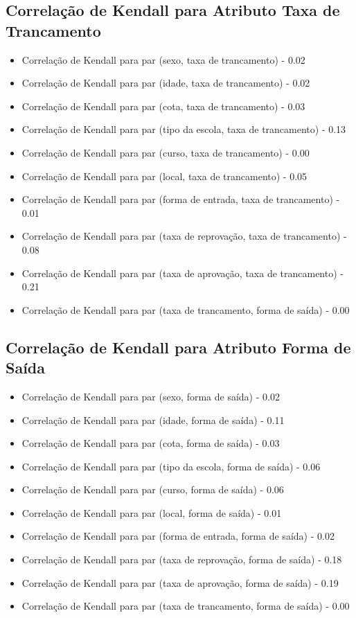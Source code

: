\subsection{Correlação de Kendall para Atributo Taxa de Trancamento}
\begin{itemize}
    \item Correlação de Kendall para par (sexo, taxa de trancamento) - 0.02
    \item Correlação de Kendall para par (idade, taxa de trancamento) - 0.02
    \item Correlação de Kendall para par (cota, taxa de trancamento) - 0.03
    \item Correlação de Kendall para par (tipo da escola, taxa de trancamento) - 0.13
    \item Correlação de Kendall para par (curso, taxa de trancamento) - 0.00
    \item Correlação de Kendall para par (local, taxa de trancamento) - 0.05
    \item Correlação de Kendall para par (forma de entrada, taxa de trancamento) - 0.01
    \item Correlação de Kendall para par (taxa de reprovação, taxa de trancamento) - 0.08
    \item Correlação de Kendall para par (taxa de aprovação, taxa de trancamento) - 0.21
    \item Correlação de Kendall para par (taxa de trancamento, forma de saída) - 0.00
\end{itemize}

\subsection{Correlação de Kendall para Atributo Forma de Saída}
\begin{itemize}
    \item Correlação de Kendall para par (sexo, forma de saída) - 0.02
    \item Correlação de Kendall para par (idade, forma de saída) - 0.11
    \item Correlação de Kendall para par (cota, forma de saída) - 0.03
    \item Correlação de Kendall para par (tipo da escola, forma de saída) - 0.06
    \item Correlação de Kendall para par (curso, forma de saída) - 0.06
    \item Correlação de Kendall para par (local, forma de saída) - 0.01
    \item Correlação de Kendall para par (forma de entrada, forma de saída) - 0.02
    \item Correlação de Kendall para par (taxa de reprovação, forma de saída) - 0.18
    \item Correlação de Kendall para par (taxa de aprovação, forma de saída) - 0.19
    \item Correlação de Kendall para par (taxa de trancamento, forma de saída) - 0.00
\end{itemize}


